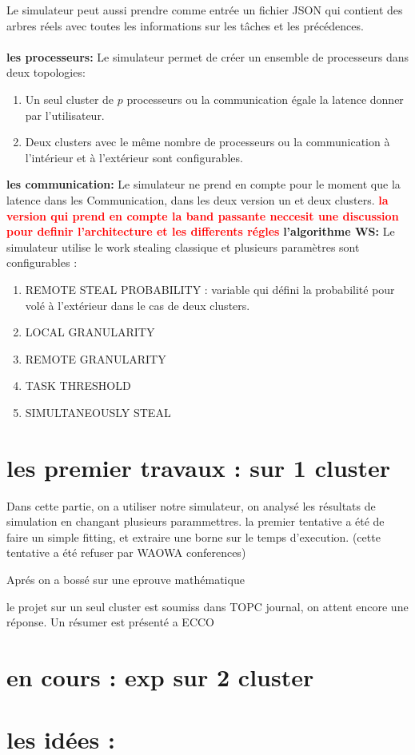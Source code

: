 \documentclass{article}
\begin{document}
    Le simulateur peut aussi prendre comme entrée un fichier JSON qui contient des arbres réels avec toutes les informations sur les tâches et les précédences.
\\\\
    \textbf{les processeurs:} Le simulateur permet de créer un ensemble de processeurs dans deux topologies:
    \begin{enumerate}
        \item Un seul cluster de $p$ processeurs ou la communication égale la latence donner par l'utilisateur.
        \item Deux clusters avec le même nombre de processeurs ou la communication à l'intérieur et à l'extérieur sont configurables.
    \end{enumerate}
\textbf{les communication:} Le simulateur ne prend en compte pour le moment que la latence dans les Communication, dans les deux version un et deux clusters.
\textcolor{red}{\textbf{la version qui prend en compte la band passante neccesit une discussion pour definir l'architecture et les differents régles}}
\newpage
    \textbf{l'algorithme WS:} Le simulateur utilise le work stealing classique et plusieurs paramètres sont configurables :
        \begin{enumerate}
            \item REMOTE STEAL PROBABILITY : variable qui défini la probabilité pour volé à l'extérieur dans le cas de deux clusters.
            \item LOCAL GRANULARITY
            \item REMOTE GRANULARITY
            \item TASK THRESHOLD
            \item SIMULTANEOUSLY STEAL
        \end{enumerate}


   \section{les premier travaux : sur 1 cluster}
   Dans cette partie, on a utiliser notre simulateur,
   on analysé les résultats de simulation en changant plusieurs parammettres.
   la premier tentative a été de faire un simple fitting,
   et extraire une borne sur le temps d'execution. (cette tentative a été refuser par WAOWA conferences)

   Aprés on a bossé sur une eprouve mathématique


   
   le projet sur un seul cluster est soumiss dans TOPC journal, on attent encore une réponse.
   Un résumer est présenté a ECCO 

   \section{en cours : exp sur 2 cluster}

   \section{les idées :}
\end{document}

